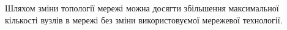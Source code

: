 \documentclass[a4paper,ukrainian,utf8,nocolumnsxix,floatsection,equationsection]{eskdtext}
\begin{document}
Шляхом зміни топології мережі можна досягти збільшення максимальної кількості вузлів в мережі без зміни використовуємої мережевої технології.


\begin{figure}[htb]

	\centering
	\qquad
\end{figure}
\end{document}
